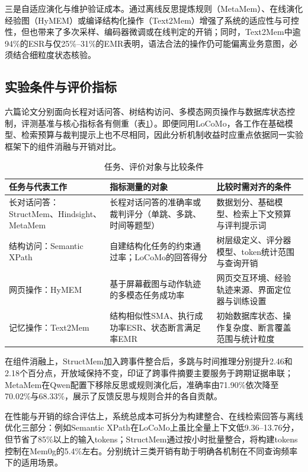 三是自适应演化与维护验证成本。通过离线反思提炼规则（MetaMem）、在线演化经验图（HyMEM）或编译结构化操作（Text2Mem）增强了系统的适应性与可控性，但也带来了多次采样、编码器微调或在线判定的开销；同时，Text2Mem中逾94\%的ESR与仅25\%--31\%的EMR表明，语法合法的操作仍可能偏离业务意图，必须结合细粒度状态核验。

\subsection{实验条件与评价指标}

六篇论文分别面向长程对话问答、树结构访问、多模态网页操作与数据库状态控制，评测基准与核心指标各有侧重（表\ref{tab:comparison-metrics}）。即便同用LoCoMo，各工作在基础模型、检索预算与裁判提示上也不尽相同，因此分析机制收益时应重点依据同一实验框架下的组件消融与开销对比。

\begin{table}[!htbp]
    \centering\small
    \caption{任务、评价对象与比较条件}
    \label{tab:comparison-metrics}
    \begin{tabularx}{\linewidth}{@{}>{\raggedright\arraybackslash}p{28mm}XX@{}}
        \toprule
        任务与代表工作 & 指标测量的对象 & 比较时需对齐的条件 \\
        \midrule
        长对话问答：StructMem、Hindsight、MetaMem & 长程对话问答的准确率或裁判评分（单跳、多跳、时间等题型） & 数据划分、基础模型、检索上下文预算与评判提示词 \\
        结构访问：Semantic XPath & 自建结构化任务的约束通过率；LoCoMo的回答得分 & 树层级定义、评分器模型、token统计范围与查询开销 \\
        网页操作：HyMEM & 基于屏幕截图与动作轨迹的多模态任务成功率 & 网页交互环境、经验轨迹来源、界面定位器与训练设置 \\
        记忆操作：Text2Mem & 结构相似性SMA、执行成功率ESR、状态断言满足率EMR & 初始数据库状态、操作复杂度、断言覆盖范围与统计粒度 \\
        \bottomrule
    \end{tabularx}
\end{table}

在组件消融上，StructMem加入跨事件整合后，多跳与时间推理分别提升2.46和2.18个百分点，开放域保持不变，印证了跨事件摘要主要服务于跨期证据串联；MetaMem在Qwen配置下移除反思或规则演化后，准确率由71.90\%依次降至70.02\%与68.33\%，展示了反馈反思与规则合并的各自贡献。

在性能与开销的综合评估上，系统总成本可拆分为构建整合、在线检索回答与离线优化三部分：例如Semantic XPath在LoCoMo上虽比全量上下文低9.36--13.76分，但节省了85\%以上的输入tokens；StructMem通过按小时批量整合，将构建tokens控制在Mem0g的5.4\%左右。分别统计三类开销有助于明确各机制在不同查询频率下的适用场景。

